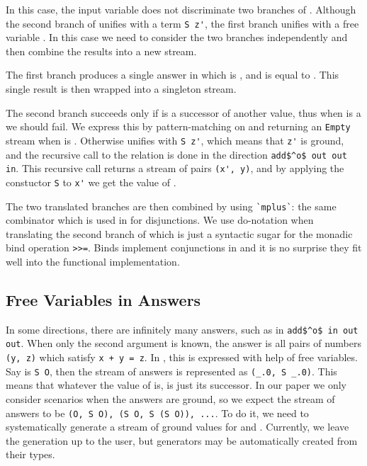 In this case, the input variable \z does not discriminate two branches of \conde.
Although the second branch of \conde unifies \z with a term \lstinline{S z'}, the first branch unifies \z with a free variable \y.
In this case we need to consider the two branches independently and then combine the results into a new stream.

The first \conde branch produces a single answer in which \x is \zero, and \y is equal to \z.
This single result is then wrapped into a singleton stream.

The second \conde branch succeeds only if \z is a successor of another value, thus when \z is a \zero we should fail.
We express this by pattern-matching on \z and returning an \lstinline{Empty} stream when \z is \zero.
Otherwise \z unifies with \lstinline{S z'}, which means that \lstinline{z'} is ground, and the recursive call to the relation is done in the direction \lstinline{add$^o$ out out in}.
This recursive call returns a stream of pairs \lstinline{(x', y)}, and by applying the constuctor \lstinline{S} to \lstinline{x'} we get the value of \x.

The two translated \conde branches are then combined by using \lstinline{`mplus`}: the same combinator which is used in \mk for disjunctions.
We use do-notation when translating the second branch of \conde which is just a syntactic sugar for the monadic bind operation \lstinline{>>=}.
Binds implement conjunctions in \mk and it is no surprise they fit well into the functional implementation.



\subsection{Free Variables in Answers}



In some directions, there are infinitely many answers, such as in \lstinline{add$^o$ in out out}.
When only the second argument is known, the answer is all pairs of numbers \lstinline{(y, z)} which satisfy \lstinline{x + y = z}.
In \mk, this is expressed with help of free variables.
Say \x is \lstinline{S O}, then the stream of answers is represented as \lstinline{(_.0, S _.0)}.
This means that whatever the value of \y is, \z is just its successor.
In our paper we only consider scenarios when the answers are ground, so we expect the stream of answers to be \lstinline{(O, S O), (S O, S (S O)), ...}.
To do it, we need to systematically generate a stream of ground values for \y and \z.
Currently, we leave the generation up to the user, but generators may be automatically created from their types.

